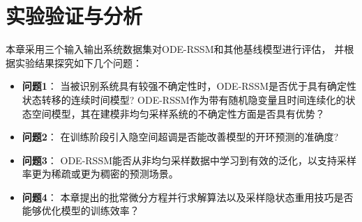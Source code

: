 \section{实验验证与分析}
\label{sec:5_experiment}
本章采用三个输入输出系统数据集对ODE-RSSM和其他基线模型进行评估，
并根据实验结果探究如下几个问题：
\begin{itemize}
\item \textbf{问题1}：
当被识别系统具有较强不确定性时，ODE-RSSM是否优于具有确定性状态转移的连续时间模型?
ODE-RSSM作为带有随机隐变量且时间连续化的状态空间模型，其在建模非均匀采样系统的不确定性方面是否具有优势？
\item \textbf{问题2}：
在训练阶段引入隐空间超调是否能改善模型的开环预测的准确度?
\item \textbf{问题3}： 
ODE-RSSM能否从非均匀采样数据中学习到有效的泛化，以支持采样率更为稀疏或更为稠密的预测场景。
\item \textbf{问题4}： 本章提出的批常微分方程并行求解算法以及采样隐状态重用技巧是否能够优化模型的训练效率？
\end{itemize}

